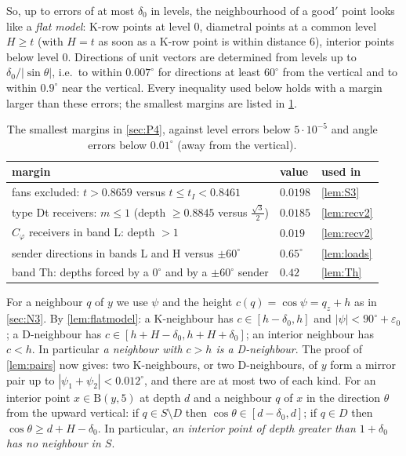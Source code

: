 \documentclass[11pt]{amsart}
\theoremstyle{definition}
\theoremstyle{remark}
\newcommand{\eps}{\varepsilon}
\newcommand{\Dd}{\mathrm{B}}      %
\begin{document}
So, up to errors of at most $\delta_0$ in levels, the neighbourhood of a good$'$ point looks like a \emph{flat model}: K-row points at level $0$, diametral points at a common level $H\ge t$ (with $H=t$ as soon as a K-row point is within distance $6$), interior points below level $0$. Directions of unit vectors are determined from levels up to $\delta_0/|\sin\theta|$, i.e.\ to within $0.007^\circ$ for directions at least $60^\circ$ from the vertical and to within $0.9^\circ$ near the vertical. Every inequality used below holds with a margin larger than these errors; the smallest margins are listed in \cref{tab:margins}.

\begin{table}[ht]
\centering\small
\renewcommand{\arraystretch}{1.15}
\begin{tabular}{@{}lll@{}}
\toprule
margin & value & used in\\
\midrule
fans excluded: $t>0.8659$ versus $t\le t_I<0.8461$ & $0.0198$ & \cref{lem:S3}\\
type Dt receivers: $m\le1$ (depth $\ge0.8845$ versus $\frac{\sqrt3}2$) & $0.0185$ & \cref{lem:recv2}\\
$C_\varphi$ receivers in band L: depth $>1$ & $0.019$ & \cref{lem:recv2}\\
sender directions in bands L and H versus $\pm60^\circ$ & $0.65^\circ$ & \cref{lem:loads}\\
band Th: depths forced by a $0^\circ$ and by a $\pm60^\circ$ sender & $0.42$ & \cref{lem:Th}\\
\bottomrule
\end{tabular}
\caption{The smallest margins in \cref{sec:P4}, against level errors below $5\cdot10^{-5}$ and angle errors below $0.01^\circ$ (away from the vertical).}\label{tab:margins}
\end{table}

For a neighbour $q$ of $y$ we use $\psi$ and the height $c(q)=\cos\psi=q_z+h$ as in \cref{sec:N3}. By \cref{lem:flatmodel}: a K-neighbour has $c\in[h-\delta_0,h]$ and $|\psi|<90^\circ+\eps_0$; a D-neighbour has $c\in[h+H-\delta_0,h+H+\delta_0]$; an interior neighbour has $c<h$. In particular \emph{a neighbour with $c>h$ is a D-neighbour}. The proof of \cref{lem:pairs} now gives: two K-neighbours, or two D-neighbours, of $y$ form a mirror pair up to $|\psi_1+\psi_2|<0.012^\circ$, and there are at most two of each kind. For an interior point $x\in\Dd(y,5)$ at depth $d$ and a neighbour $q$ of $x$ in the direction $\theta$ from the upward vertical: if $q\in S\setminus D$ then $\cos\theta\in[d-\delta_0,d]$; if $q\in D$ then $\cos\theta\ge d+H-\delta_0$. In particular, \emph{an interior point of depth greater than $1+\delta_0$ has no neighbour in $S$}.
\end{document}
